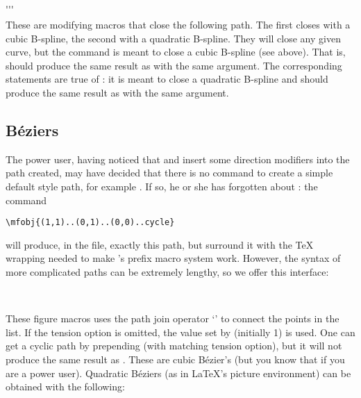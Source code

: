 \documentclass[letterpaper]{article}
\begin{document}
\begin{cd}
$\ldots$\\
$\ldots$%
%
\end{cd}

These are modifying macros that close the following path. The first
closes with a cubic B-spline, the second with a quadratic B-spline. They
will close any given curve, but the command  is meant to
close a cubic B-spline (see above). That is, 
should produce the same result as  with the same
argument. The corresponding statements are true of : it is
meant to close a quadratic B-spline and  should
produce the same result as  with the same argument.

\subsection{B\'eziers}

The power user, having noticed that  and  insert
some direction modifiers into the path created, may have decided that
there is no \mfp{} command to create a simple \MF{} default style path,
for example . If so, he or she has forgotten
about : the command
\begin{verbatim}
\mfobj{(1,1)..(0,1)..(0,0)..cycle}
\end{verbatim}
will produce, in the  file, exactly this path, but surround it
with the \TeX{} wrapping needed to make \mfp{}'s prefix macro system work.
However, the syntax of more complicated paths can be extremely lengthy,
so we offer this interface:

\begin{cd}
  \\
%
\end{cd}

These figure macros uses the \MF{} path join operator `' to connect the points in the list. If the tension option
 is omitted, the value set by 
(initially 1) is used. One can get a cyclic path by prepending
 (with matching tension option), but it will not produce the
same result as . These are cubic B\'ezier's (but you
know that if you are a power user). Quadratic B\'eziers (as in
\LaTeX{}'s picture environment) can be obtained with the following:
\end{document}
